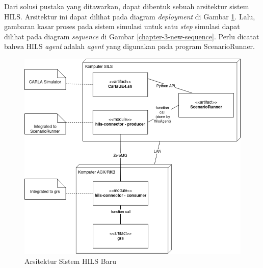 Dari solusi pustaka yang ditawarkan, dapat dibentuk sebuah arsitektur sistem
HILS. Arsitektur ini dapat dilihat pada diagram \textit{deployment} di Gambar
\ref{chapter-3-new-architecture}. Lalu, gambaran kasar proses pada sistem
simulasi untuk satu \textit{step} simulasi dapat dilihat pada diagram
\textit{sequence} di Gambar \ref{chapter-3-new-sequence}. Perlu dicatat bahwa
HILS \textit{agent} adalah \textit{agent} yang digunakan pada program
ScenarioRunner.

\begin{figure}[h!]
	\centering
	\includegraphics[width=1.0\textwidth]{resources/chapter-3/deployment-diagram-new-hils.png}
	\caption{Arsitektur Sistem HILS Baru}
	\label{chapter-3-new-architecture}
\end{figure}

